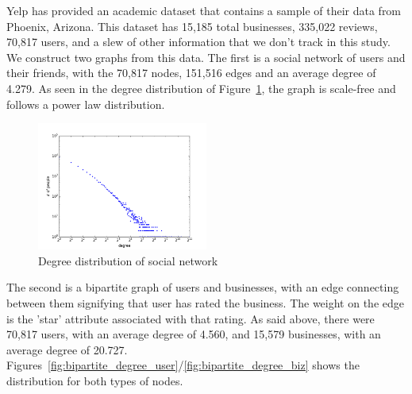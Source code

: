 \documentclass[10pt]{article}
\begin{document}
Yelp has provided an academic dataset that contains a sample of their data from Phoenix, Arizona.  This dataset has 15,185 total businesses, 335,022 reviews, 70,817 users, and a slew of other information that we don't track in this study.  We construct two graphs from this data.  The first is a social network of users and their friends, with the 70,817 nodes, 151,516 edges and an average degree of 4.279.  As seen in the degree distribution of Figure~\ref{fig:social_degree}, the graph is scale-free and follows a power law distribution.

\begin{figure}[ht]
  \centering
    \includegraphics[width=0.5\textwidth]{soc_degree_distribution.png}
  \caption{Degree distribution of social network}
  \label{fig:social_degree}
\end{figure}


The second is a bipartite graph of users and businesses, with an edge connecting between them signifying that user has rated the business.  The weight on the edge is the 'star' attribute associated with that rating.  As said above, there were 70,817 users, with an average degree of 4.560, and 15,579 businesses, with an average degree of 20.727. Figures~\ref{fig:bipartite_degree_user}/\ref{fig:bipartite_degree_biz} shows the distribution for both types of nodes.
\end{document}
